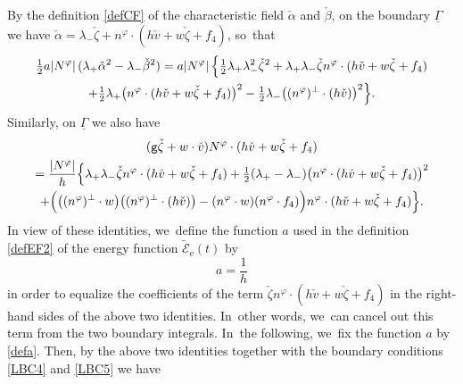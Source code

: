 \documentclass[11pt]{article}
\newcommand{\gr}{{\mathtt g}}
\newcommand{\ul}[1]{\underline{#1}}
\newcommand{\itGamma}{\mathit{\Gamma}}
\theoremstyle{definition}
\begin{document}
By the definition \eqref{defCF} of the characteristic field $\check{\alpha}$ and $\check{\beta}$, on the boundary $\ul{\itGamma}$ we have
$\check{\alpha}=\lambda_-\check{\zeta}+n^\varphi\cdot(h\check{v}+w\check{\zeta}+f_4)$, so~that
\begin{multline*}
\tfrac12a|N^\varphi|\,(\lambda_+\check{\alpha}^2-\lambda_-\check{\beta}^2)
= a|N^\varphi|\,\Bigl\{ \tfrac12\lambda_+\lambda_-^2\check{\zeta}^2 + \lambda_+\lambda_-\check{\zeta}n^\varphi\cdot(h\check{v}+w\check{\zeta}+f_4) \\
+ \tfrac12\lambda_+ \bigl(n^\varphi\cdot(h\check{v}+w\check{\zeta}+f_4) \bigr)^2 - \tfrac12\lambda_-\bigl((n^\varphi)^\perp\cdot(h\check{v}) \bigr)^2 \Bigr\}.
\end{multline*}
Similarly, on $\ul{\itGamma}$ we also have\enlargethispage{-2\baselineskip}
\begin{multline*}
(\gr\check{\zeta}+w\cdot\check{v})N^\varphi\cdot(h\check{v}+w\check{\zeta}+f_4) \\
= \dfrac{|N^\varphi|}{h}\Bigl\{ \lambda_+\lambda_-\check{\zeta}n^\varphi\cdot(h\check{v}+w\check{\zeta}+f_4)
+ \tfrac12(\lambda_+-\lambda_-) \bigl(n^\varphi\cdot(h\check{v}+w\check{\zeta}+f_4) \bigr)^2 \\
+ \Bigl(\bigl((n^\varphi)^\perp\cdot w \bigr) \bigl((n^\varphi)^\perp\cdot(h\check{v}) \bigr)-(n^\varphi\cdot w)(n^\varphi\cdot f_4) \Bigr)
n^\varphi\cdot(h\check{v}+w\check{\zeta}+f_4) \Bigr\}.
\end{multline*}
In view of these identities, we~define the function $a$ used in the definition \eqref{defEF2} of the energy function $\widetilde{\mathscr{E}}_\mathrm{e}(t)$ by
\begin{equation}\label{defa}
a=\frac{1}{h}
\end{equation}
in order to equalize the coefficients of the term $\check{\zeta}n^\varphi\cdot(h\check{v}+w\check{\zeta}+f_4)$ in the right-hand sides of the above two identities. In~other words, we~can cancel out this term from the two boundary integrals. In~the following, we~fix the function $a$ by \eqref{defa}.
Then, by the above two identities together with the boundary conditions \eqref{LBC4} and \eqref{LBC5} we have
\end{document}

